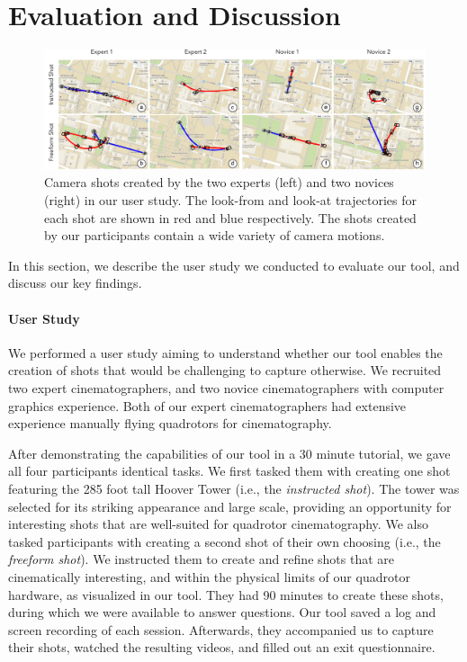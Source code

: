 \section{Evaluation and Discussion}\label{results}

\begin{figure}[th!]
\centering
\includegraphics[width=5.5in]{images/2015_siggraph_asia/eval_trajectories.pdf}
\caption{
Camera shots created by the two experts (left) and two novices (right) in our user study.
The look-from and look-at trajectories for each shot are shown in red and blue respectively. The shots created by our participants contain a wide variety of camera motions.
}
  \label{figure:all_shots}
\end{figure}

In this section, we describe the user study we conducted to evaluate our tool, and discuss our key findings.

\paragraph{User Study}

We performed a user study aiming to understand whether our tool enables the creation of shots that would be challenging to capture otherwise.
We recruited two expert cinematographers, and two novice cinematographers with computer graphics experience. Both of our expert cinematographers had extensive experience manually flying quadrotors for cinematography.

After demonstrating the capabilities of our tool in a 30 minute tutorial, we gave all four participants identical tasks.
We first tasked them with creating one shot featuring the 285 foot tall Hoover Tower (i.e., the \emph{instructed shot}).
The tower was selected for its striking appearance and large scale, providing an opportunity for interesting shots that are well-suited for quadrotor cinematography.
We also tasked participants with creating a second shot of their own choosing (i.e., the \emph{freeform shot}).
We instructed them to create and refine shots that are cinematically interesting, and within the physical limits of our quadrotor hardware, as visualized in our tool.
They had 90 minutes to create these shots, during which we were available to answer questions.
Our tool saved a log and screen recording of each session.
Afterwards, they accompanied us to capture their shots, watched the resulting videos, and filled out an exit questionnaire.

